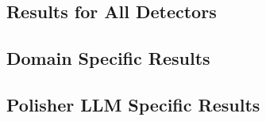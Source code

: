 \subsection{Results for All Detectors} \label{app:result_all_detectors}


\subsection{Domain Specific Results} \label{app:domain_results}


\clearpage
\newpage
\subsection{Polisher LLM Specific Results} \label{app:polisher_results}
